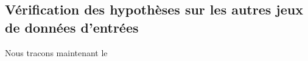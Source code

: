 \documentclass[../main]{subfiles}
\begin{document}


\subsection{Vérification des hypothèses sur les autres jeux de données d'entrées}

Nous tracons maintenant le 
\end{document}
